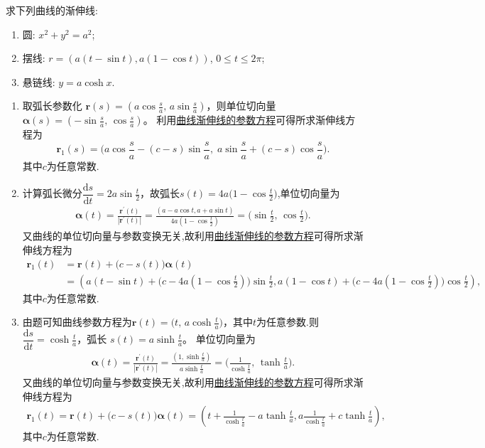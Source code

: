 \documentclass[../../main.tex]{subfiles}%
\begin{document}
\begin{example}
求下列曲线的渐伸线:
\begin{enumerate}[(1)]
\item 圆: $x^2+y^2=a^2$;
\item 摆线: $r=(a(t-\sin t),a(1-\cos t))$, $0\leqslant t\leqslant 2\pi$;
\item 悬链线: $y=a\cosh x$.
\end{enumerate}
\end{example}
\begin{solution}
\begin{enumerate}[(1)]
\item 取弧长参数化 \(\boldsymbol{r}(s)=(a\cos\frac{s}{a},\,a\sin\frac{s}{a})\)，则单位切向量 \(\boldsymbol{\alpha}(s)=(-\sin\frac{s}{a},\,\cos\frac{s}{a})\)。  
利用\hyperref[theorem:微分几何-定理7.3]{曲线渐伸线的参数方程}可得所求渐伸线方程为
\[
\boldsymbol{r}_1(s)=\bigl(a\cos\frac{s}{a}-(c-s)\sin\frac{s}{a},\; a\sin\frac{s}{a}+(c-s)\cos\frac{s}{a}\bigr).
\]
其中$c$为任意常数.

\item 计算弧长微分\(\dfrac{\mathrm{d}s}{\mathrm{d}t}=2a\sin\frac{t}{2}\)，故弧长\(s(t)=4a\bigl(1-\cos\frac{t}{2}\bigr)\),单位切向量为
\begin{align*}
\boldsymbol{\alpha }(t)=\frac{\boldsymbol{r}^{\prime}\left( t \right)}{\left| \boldsymbol{r}^{\prime}\left( t \right) \right|}=\frac{\left( a-a\cos t,a+a\sin t \right)}{4a\left( 1-\cos \frac{t}{2} \right)}=\bigl( \sin \frac{t}{2},\,\cos \frac{t}{2} \bigr) .
\end{align*} 
又曲线的单位切向量与参数变换无关,故利用\hyperref[theorem:微分几何-定理7.3]{曲线渐伸线的参数方程}可得所求渐伸线方程为
\begin{align*}
\boldsymbol{r}_1(t)&=\boldsymbol{r}(t)+\bigl( c-s(t) \bigr) \boldsymbol{\alpha }(t)
\\
&=\left( a(t-\sin t)+\bigl( c-4a(1-\cos \frac{t}{2}) \bigr) \sin \frac{t}{2},a(1-\cos t)+\bigl( c-4a(1-\cos \frac{t}{2}) \bigr) \cos \frac{t}{2} \right) ,
\end{align*}
其中$c$为任意常数.

\item 由题可知曲线参数方程为\(\boldsymbol{r}(t)=\bigl(t,\,a\cosh\frac{t}{a}\bigr)\)，其中$t$为任意参数.则 \(\dfrac{\mathrm{d}s}{\mathrm{d}t}=\cosh\frac{t}{a}\)，弧长 \(s(t)=a\sinh\frac{t}{a}\)。  
单位切向量为
\begin{align*}
\boldsymbol{\alpha }(t)=\frac{\boldsymbol{r}^{\prime}\left( t \right)}{\left| \boldsymbol{r}^{\prime}\left( t \right) \right|}=\frac{\left( 1,\sinh \frac{t}{a} \right)}{a\sinh \frac{t}{a}}=\bigl( \frac{1}{\cosh \frac{t}{a}},\,\tanh \frac{t}{a} \bigr) .
\end{align*}  
又曲线的单位切向量与参数变换无关,故利用\hyperref[theorem:微分几何-定理7.3]{曲线渐伸线的参数方程}可得所求渐伸线方程为
\begin{align*}
\boldsymbol{r}_1(t)=\boldsymbol{r}(t)+\bigl( c-s(t) \bigr) \boldsymbol{\alpha }(t)=\left( t+\frac{1}{\cosh \frac{t}{a}}-a\tanh \frac{t}{a},a\frac{1}{\cosh \frac{t}{a}}+c\tanh \frac{t}{a} \right) ,
\end{align*}
其中$c$为任意常数.
\end{enumerate}


\end{solution}
\end{document}

